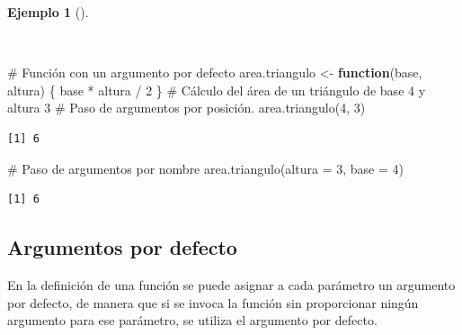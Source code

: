 \documentclass[
  spanish,
  a4paper,
]{scrreport}
\newenvironment{Shaded}{\begin{snugshade}}{\end{snugshade}}
\newcommand{\AttributeTok}[1]{\textcolor[rgb]{0.40,0.45,0.13}{#1}}
\newcommand{\CommentTok}[1]{\textcolor[rgb]{0.37,0.37,0.37}{#1}}
\newcommand{\ControlFlowTok}[1]{\textcolor[rgb]{0.00,0.23,0.31}{\textbf{#1}}}
\newcommand{\DecValTok}[1]{\textcolor[rgb]{0.68,0.00,0.00}{#1}}
\newcommand{\FunctionTok}[1]{\textcolor[rgb]{0.28,0.35,0.67}{#1}}
\newcommand{\NormalTok}[1]{\textcolor[rgb]{0.00,0.23,0.31}{#1}}
\newcommand{\OtherTok}[1]{\textcolor[rgb]{0.00,0.23,0.31}{#1}}
\newcommand{\SpecialCharTok}[1]{\textcolor[rgb]{0.37,0.37,0.37}{#1}}
\theoremstyle{definition}
\theoremstyle{definition}
\newtheorem{example}{Ejemplo}[chapter]
\theoremstyle{remark}
\begin{document}
\begin{example}[]\protect\hypertarget{exm-paso-parametros-funcion}{}\label{exm-paso-parametros-funcion}

~

\begin{Shaded}
\begin{Highlighting}[]
\CommentTok{\# Función con un argumento por defecto}
\NormalTok{area.triangulo }\OtherTok{\textless{}{-}} \ControlFlowTok{function}\NormalTok{(base, altura) \{}
\NormalTok{  base }\SpecialCharTok{*}\NormalTok{ altura }\SpecialCharTok{/} \DecValTok{2}
\NormalTok{\}}
\CommentTok{\# Cálculo del área de un triángulo de base 4 y altura 3}
\CommentTok{\# Paso de argumentos por posición. }
\FunctionTok{area.triangulo}\NormalTok{(}\DecValTok{4}\NormalTok{, }\DecValTok{3}\NormalTok{)}
\end{Highlighting}
\end{Shaded}

\begin{verbatim}
[1] 6
\end{verbatim}

\begin{Shaded}
\begin{Highlighting}[]
\CommentTok{\# Paso de argumentos por nombre}
\FunctionTok{area.triangulo}\NormalTok{(}\AttributeTok{altura =} \DecValTok{3}\NormalTok{, }\AttributeTok{base =} \DecValTok{4}\NormalTok{)}
\end{Highlighting}
\end{Shaded}

\begin{verbatim}
[1] 6
\end{verbatim}

\end{example}

\subsection{Argumentos por defecto}\label{argumentos-por-defecto}

En la definición de una función se puede asignar a cada parámetro un
argumento por defecto, de manera que si se invoca la función sin
proporcionar ningún argumento para ese parámetro, se utiliza el
argumento por defecto.
\end{document}
